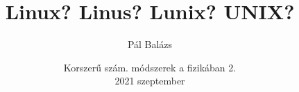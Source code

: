 \title[Linux? Linus? Lunix? UNIX?]
{Linux? Linus? Lunix? UNIX?}


\author[Pál Balázs]
{Pál Balázs}


\date[ELTE 2021]
{Korszerű szám. módszerek a fizikában 2.\\2021 szeptember}


